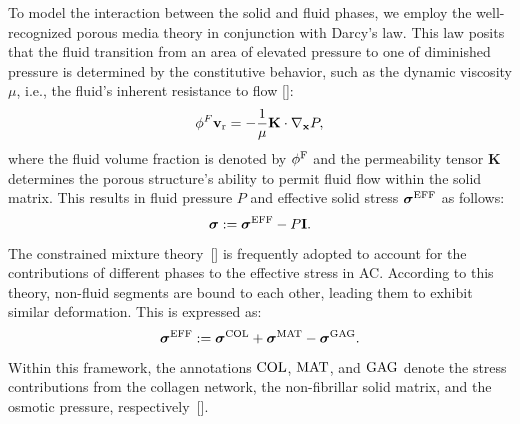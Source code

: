 To model the interaction between the solid and fluid phases, we employ the well-recognized porous media theory in conjunction with Darcy's law. This law posits that the fluid transition from an area of elevated pressure to one of diminished pressure is determined by the constitutive behavior, such as the dynamic viscosity $\mu$, i.e., the fluid's inherent resistance to flow [\cite{karl1943,fa1979}]:
%
\begin{equation}\label{eq-darcy}
    \phi^F \mathbf{v}_{\rm r} = -\frac{1}{\mu }\mathbf{K} \cdot \nabla_\mathbf{x} P,
\end{equation}
%
where the fluid volume fraction is denoted by $\phi^{\rm F}$ and the permeability tensor $\mathbf{K}$ determines the porous structure's ability to permit fluid flow within the solid matrix. This results in fluid pressure $P$ and effective solid stress $\boldsymbol{\sigma}^{\rm EFF}$ as follows:
%
\begin{equation}\label{eq-stress}
    \boldsymbol{\sigma} :=  \boldsymbol{\sigma}^{\rm EFF} - P\mathbf{I}.
\end{equation}
%
The constrained mixture theory~[\cite{klisch1999}] is frequently adopted to account for the contributions of different phases to the effective stress in AC. According to this theory, non-fluid segments are bound to each other, leading them to exhibit similar deformation. This is expressed as:
%
\begin{equation}\label{eq-cartilage_solid}
    \boldsymbol{\sigma}^{\rm EFF} :=  \boldsymbol{\sigma}^{\rm COL} + \boldsymbol{\sigma}^{\rm MAT} - \boldsymbol{\sigma}^{\rm GAG}.
\end{equation}
%
Within this framework, the annotations ${\rm COL}$, ${\rm MAT}$, and ${\rm GAG}$ denote the stress contributions from the collagen network, the non-fibrillar solid matrix, and the osmotic pressure, respectively~[\cite{mow1980,wilson2005,sajjadinia2019}].

